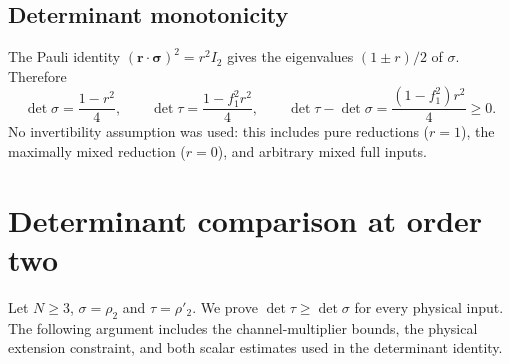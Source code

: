 \documentclass[11pt,a4paper]{article}
\begin{document}
\subsection{Determinant monotonicity}
The Pauli identity $(\mathbf r\cdot\boldsymbol\sigma)^2=r^2I_2$
gives the eigenvalues $(1\pm r)/2$ of $\sigma$. Therefore
\[
 \det\sigma=\frac{1-r^2}{4},\qquad
 \det\tau=\frac{1-f_1^2r^2}{4},\qquad
 \boxed{\det\tau-\det\sigma=\frac{(1-f_1^2)r^2}{4}\ge0.}
\]
No invertibility assumption was used: this includes pure reductions
($r=1$), the maximally mixed reduction ($r=0$), and arbitrary mixed
full inputs.

\clearpage
\section{Determinant comparison at order two}\label{sec:t2}
Let $N\ge3$, $\sigma=\rho_2$ and $\tau=\rho'_2$. We prove
$\det\tau\ge\det\sigma$ for every physical input. The following argument
includes the channel-multiplier bounds, the physical extension constraint,
and both scalar estimates used in the determinant identity.
\end{document}
